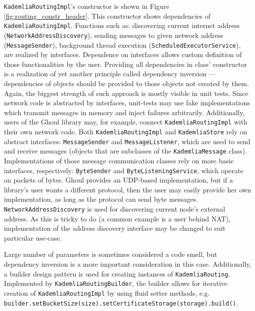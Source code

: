 {\texttt{KademliaRoutingImpl}'s constructor} is shown in Figure
\ref{fig:routing_constr_header}.
This constructor shows dependencies of \texttt{KademliaRoutingImpl}.
Functions such as: discovering current internet address
(\texttt{NetworkAddressDiscovery}), sending messages to given network address
(\texttt{MessageSender}), background thread execution
(\texttt{ScheduledExecutorService}), are realized by interfaces.
Dependence on interfaces allows custom definition of those functionalities by
the user.
Providing all dependencies in class' constructor is a realization of yet another
principle called dependency inversion --- dependencies of objects should be
provided to those objects not created by them.
Again, the biggest strength of such approach is mostly visible in unit tests.
Since network code is abstracted by interfaces, unit-tests may use fake
implementations which transmit messages in memory and inject failures
arbitrarily.
Additionally, users of the Ghoul library may, for example, connect
\texttt{KademliaRoutingImpl} with their own network code.
Both \texttt{KademliaRoutingImpl} and \texttt{KademliaStore} rely on abstract
interfaces: \texttt{MessageSender} and \texttt{MessageListener}, which are used
to send and receive messages (objects that are subclasses of
the \texttt{KademliaMessage} class).
Implementations of those message communication classes rely on more basic
interfaces, respectively: \texttt{ByteSender} and \texttt{ByteListeningService},
which operate on packets of bytes.
Ghoul provides an UDP-based implementation, but if a library's user wants a
different protocol, then the user may easily provide her own implementation, as
long as the protocol can send byte messages. 
\texttt{NetworkAddressDiscovery} is used for discovering current node's
external address.
As this is tricky to do (a common example is a user behind NAT), implementation
of the address discovery interface may be changed to suit particular use-case.

Large number of parameters is sometimes considered a code smell, but dependency
inversion is a more important consideration in this case.
Additionally, a builder design pattern is used for creating instances of
\texttt{KademliaRouting}.
Implemented by \texttt{KademliaRoutingBuilder}, the builder allows for iterative
creation of \texttt{KademliaRoutingImpl} by using fluid setter methods, e.g.
\texttt{builder.setBucketSize(size).setCertificateStorage(storage).build()}.

